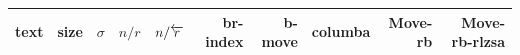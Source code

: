 
\begin{tabular}{l|r|r|r|r|r|r|r|r|r}
\hline
text & size & $\sigma$ & $n/r$ & $n/\overleftarrow{r}$ & br-index & b-move & columba & Move-rb & Move-rb-rlzsa \\
\hline

\end{tabular}

